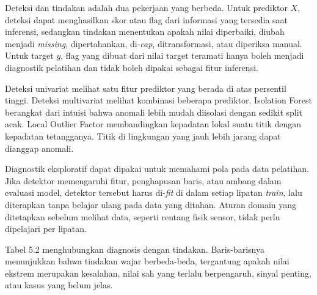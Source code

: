Deteksi dan tindakan adalah dua pekerjaan yang berbeda. Untuk prediktor \(X\), deteksi dapat menghasilkan skor atau flag dari informasi yang tersedia saat inferensi, sedangkan tindakan menentukan apakah nilai diperbaiki, diubah menjadi \emph{missing}, dipertahankan, di-\emph{cap}, ditransformasi, atau diperiksa manual. Untuk target \(y\), flag yang dibuat dari nilai target teramati hanya boleh menjadi diagnostik pelatihan dan tidak boleh dipakai sebagai fitur inferensi.

Deteksi univariat melihat satu fitur prediktor yang berada di atas persentil tinggi. Deteksi multivariat melihat kombinasi beberapa prediktor. Isolation Forest berangkat dari intuisi bahwa anomali lebih mudah diisolasi dengan sedikit split acak. Local Outlier Factor membandingkan kepadatan lokal suatu titik dengan kepadatan tetangganya. Titik di lingkungan yang jauh lebih jarang dapat dianggap anomali.

Diagnostik eksploratif dapat dipakai untuk memahami pola pada data pelatihan. Jika detektor memengaruhi fitur, penghapusan baris, atau ambang dalam evaluasi model, detektor tersebut harus di-\emph{fit} di dalam setiap lipatan \emph{train}, lalu diterapkan tanpa belajar ulang pada data yang ditahan. Aturan domain yang ditetapkan sebelum melihat data, seperti rentang fisik sensor, tidak perlu dipelajari per lipatan.

Tabel 5.2 menghubungkan diagnosis dengan tindakan. Baris-barisnya menunjukkan bahwa tindakan wajar berbeda-beda, tergantung apakah nilai ekstrem merupakan kesalahan, nilai sah yang terlalu berpengaruh, sinyal penting, atau kasus yang belum jelas.


